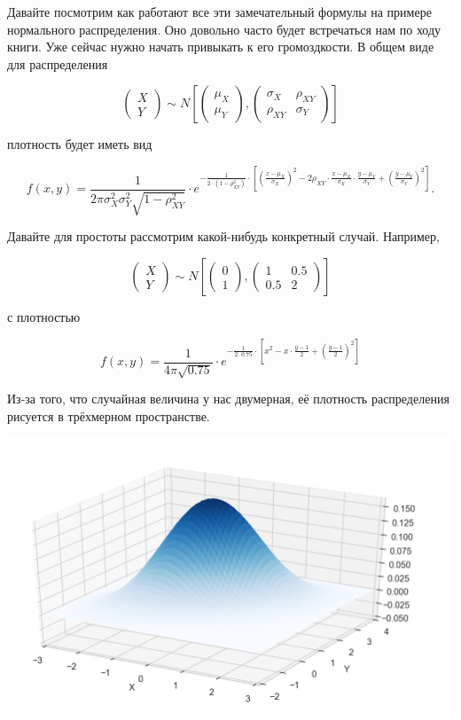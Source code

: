 \documentclass[12pt, a4paper, oneside]{extreport}
\theoremstyle{plain}              %
\theoremstyle{definition}         %
\begin{document}
Давайте посмотрим как работают все эти замечательный формулы на примере нормального распределения. Оно довольно часто будет встречаться нам по ходу книги. Уже сейчас нужно начать привыкать к его громоздкости.  В общем виде для распределения

\[ 
\begin{pmatrix}
X \\
Y
\end{pmatrix} \sim N \left[ 
\begin{pmatrix}
\mu_X \\
\mu_Y
\end{pmatrix} ,
\begin{pmatrix}
\sigma_X & \rho_{XY} \\
 \rho_{XY}  & \sigma_Y
\end{pmatrix} 
\right]
\]

плотность будет иметь вид

\[
f(x,y) = \frac{1}{2 \pi \sigma_X^2 \sigma_Y^2  \sqrt{1 - \rho_{XY}^2}} \cdot e^{-\frac{1}{2 \cdot (1 - \rho^2_{XY})} \cdot \left[ \left(  \frac{x - \mu_X}{\sigma_X}  \right)^2 - 2 \rho_{XY} \cdot \frac{x - \mu_X}{\sigma_X} \cdot \frac{y - \mu_Y}{\sigma_Y} + \left( \frac{y - \mu_Y}{\sigma_Y}    \right)^2   \right]}.
\]

Давайте для простоты рассмотрим какой-нибудь конкретный случай. Например, 

\[ 
\begin{pmatrix}
X \\
Y
\end{pmatrix} \sim N \left[
\begin{pmatrix}
0 \\
1
\end{pmatrix} ,
\begin{pmatrix}
1 & 0.5 \\
0.5  & 2
\end{pmatrix} 
\right]
\]

с плотностью 

\[
f(x,y) = \frac{1}{4 \pi \sqrt{0.75}} \cdot e^{-\frac{1}{2 \cdot 0.75} \cdot \left[ x^2 - x \cdot \frac{y - 1}{2} + \left( \frac{y - 1}{2}    \right)^2   \right]}
\]

Из-за того, что случайная величина у нас двумерная, её плотность распределения рисуется в трёхмерном пространстве. 

\begin{center}
\includegraphics[scale=0.25]{two_normal_1.png}
\end{center}
\end{document}
